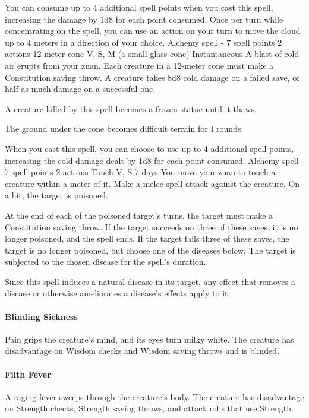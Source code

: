     You can consume up to 4 additional spell points when you cast this spell, increasing the damage by 1d8 for each point consumed.
    Once per turn while concentrating on the spell, you can use an action on your turn to move the cloud up to 4 meters in a direction of your choice.
    {Alchemy spell - 7 spell points}
    {2 actions}
    {12-meter-cone}
    {V, S, M (a small glass cone)}
    {Instantaneous}
    A blast of cold air erupts from your zuan.
    Each creature in a 12-meter cone must make a Constitution saving throw.
    A creature takes 8d8 cold damage on a failed save, or half as much damage on a successful one.

    A creature killed by this spell becomes a frozen statue until it thaws.

    The ground under the cone becomes difficult terrain for I rounds.

    When you cast this spell, you can choose to use up to 4 additional spell points, increasing the cold damage dealt by 1d8 for each point consumed.
    {Alchemy spell - 7 spell points}
    {2 actions}
    {Touch}
    {V, S}
    {7 days}
    You move your zuan to touch a creature within a meter of it.
    Make a melee spell attack against the creature.
    On a hit, the target is poisoned.

    At the end of each of the poisoned target's turns, the target must make a Constitution saving throw.
    If the target succeeds on three of these saves, it is no longer poisoned, and the spell ends.
    If the target fails three of these saves, the target is no longer poisoned, but choose one of the diseases below.
    The target is subjected to the chosen disease for the spell's duration.

    Since this spell induces a natural disease in its target, any effect that removes a disease or otherwise ameliorates a disease's effects apply to it.

    \paragraph{Blinding Sickness}
    Pain grips the creature's mind, and its eyes turn milky white.
    The creature has disadvantage on Wisdom checks and Wisdom saving throws and is blinded.
    \paragraph{Filth Fever}
    A raging fever sweeps through the creature's body.
    The creature has disadvantage on Strength checks, Strength saving throws, and attack rolls that use Strength.
